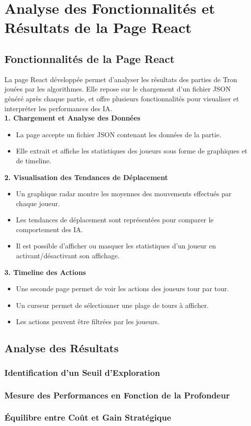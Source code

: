 \section{Analyse des Fonctionnalités et Résultats de la Page React}

\subsection{Fonctionnalités de la Page React}
La page React développée permet d'analyser les résultats des parties de Tron jouées par les algorithmes. Elle repose sur le chargement d'un fichier JSON généré après chaque partie, et offre plusieurs fonctionnalités pour visualiser et interpréter les performances des IA. \\
\textbf{1. Chargement et Analyse des Données}
\begin{itemize}
    \item La page accepte un fichier JSON contenant les données de la partie.
    \item Elle extrait et affiche les statistiques des joueurs sous forme de graphiques et de timeline.
\end{itemize}
\textbf{2. Visualisation des Tendances de Déplacement}
\begin{itemize}
    \item Un graphique radar montre les moyennes des mouvements effectués par chaque joueur.
    \item Les tendances de déplacement sont représentées pour comparer le comportement des IA.
    \item Il est possible d'afficher ou masquer les statistiques d'un joueur en activant/désactivant son affichage.
\end{itemize}
\textbf{3. Timeline des Actions}
\begin{itemize}
    \item Une seconde page permet de voir les actions des joueurs tour par tour.
    \item Un curseur permet de sélectionner une plage de tours à afficher.
    \item Les actions peuvent être filtrées par les joueurs.
\end{itemize}

\subsection{Analyse des Résultats}
\subsubsection{Identification d'un Seuil d'Exploration}
\subsubsection{Mesure des Performances en Fonction de la Profondeur}
\subsubsection{Équilibre entre Coût et Gain Stratégique}